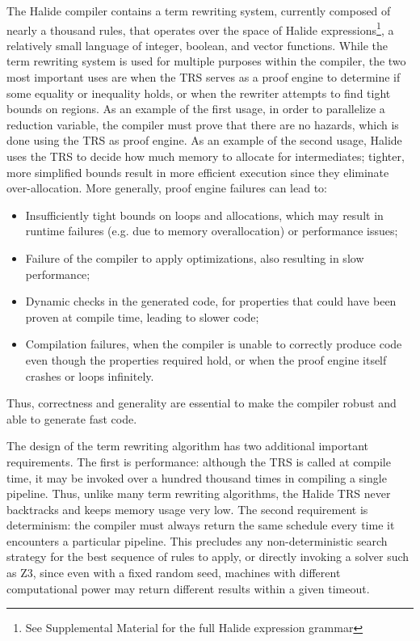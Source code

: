\documentclass[acmsmall,review,anonymous]{acmart}\settopmatter{printfolios=true,printccs=false,printacmref=false}
\begin{document}
The Halide compiler contains a term rewriting system, currently composed of
nearly a thousand rules, that operates over the space of Halide
expressions\footnote{See Supplemental Material for the full Halide
  expression grammar}, a relatively small language of integer, boolean, and vector functions. While the term rewriting system is used for multiple
purposes within the compiler, the two most important
uses are when the TRS serves as a proof engine to determine if
some equality or inequality holds, or when the rewriter attempts to find tight
bounds on regions. As an example of the first usage, in order to parallelize a
reduction variable, the compiler must prove that there are no hazards, which is
done using the TRS as proof engine.  As an example of the second usage, Halide uses
the TRS to decide how much memory to allocate for intermediates; tighter, more
simplified bounds result in more efficient execution since they eliminate over-allocation.
More generally, proof engine failures can lead to:
\begin{itemize}
\item Insufficiently tight bounds on loops and allocations, which may result in
  runtime failures (e.g. due to memory overallocation) or performance issues;

\item Failure of the compiler to apply optimizations, also resulting in slow performance;

\item Dynamic checks in the generated code, for properties that could have been proven
  at compile time, leading to slower code;

\item Compilation failures, when the compiler is unable to correctly produce code
  even though the properties required hold, or when the proof engine itself crashes
  or loops infinitely.
\end{itemize}
Thus, correctness and generality are essential to make the compiler robust and
able to generate fast code.

The design of the term rewriting algorithm has two additional important
requirements. The first is performance: although the TRS is called at
compile time, it may be invoked over a hundred thousand times in compiling a single pipeline. 
Thus, unlike many term rewriting algorithms, the Halide TRS
never backtracks and keeps memory usage very low. The second requirement is determinism: the compiler must
always return the same schedule every time it encounters a particular pipeline.
This precludes any non-deterministic search strategy for the best sequence of
rules to apply, or directly invoking a solver such as Z3, since even with a
fixed random seed, machines with different computational power may return
different results within a given timeout.
\end{document}

